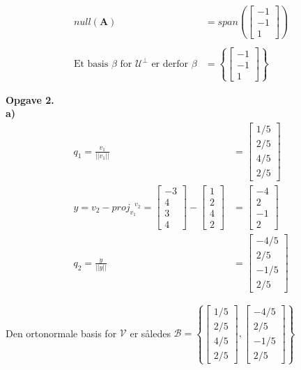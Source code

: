 \documentclass[12pt]{article}
\begin{document}
{\begin{align*}
null (\textbf{A}) &= span \left( \begin{bmatrix}-1 \\ -1 \\ 1 \end{bmatrix} \right)\\\\
\text{Et basis $\beta$ for }\mathcal{U}^\perp \text{ er derfor } \beta &=
\left\{ \begin{bmatrix}-1 \\ -1 \\ 1 \end{bmatrix} \right\}
\end{align*}

\textbf{\large Opgave 2.}\\

\textbf{a)}\\
\begin{align*}
 q_1 = \frac{v_1}{||v_1||}  &= \begin{bmatrix}1/5\\2/5\\4/5\\2/5\end{bmatrix} \\
y = v_2 -  proj^{ \text{ }  v_2}_{v_1} = 
\begin{bmatrix}-3\\4\\3\\4\end{bmatrix} -
\begin{bmatrix}1\\2\\4\\2\end{bmatrix} &= 
\begin{bmatrix}-4\\2\\-1\\2\end{bmatrix}
\\
q_2 = \frac{y}{||y||} &= \begin{bmatrix}-4/5\\2/5\\-1/5\\2/5\end{bmatrix}
\end{align*}

Den ortonormale basis for  $\mathcal{V}$ er således $ \mathcal{B} = 
\left \{ \begin{bmatrix}1/5\\2/5\\4/5\\2/5\end{bmatrix}, 
 \begin{bmatrix}-4/5\\2/5\\-1/5\\2/5\end{bmatrix}  \right \} $  

}
\end{document}
